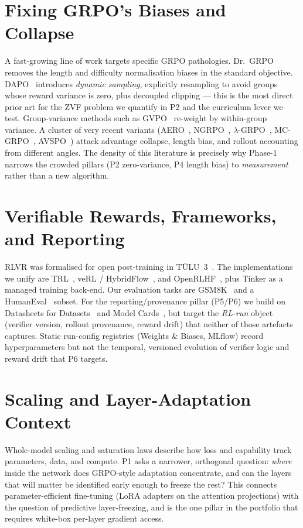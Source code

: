 \section{Fixing GRPO's Biases and Collapse}
A fast-growing line of work targets specific GRPO pathologies. Dr.\
GRPO~\cite{liu2025drgrpo} removes the length and difficulty normalisation biases in
the standard objective. DAPO~\cite{yu2025dapo} introduces \emph{dynamic sampling},
explicitly resampling to avoid groups whose reward variance is zero, plus decoupled
clipping --- this is the most direct prior art for the ZVF problem we quantify in
P2 and the curriculum lever we test. Group-variance methods such as
GVPO~\cite{gvpo2025} re-weight by within-group variance. A cluster of very recent
variants (AERO~\cite{aero2026}, NGRPO~\cite{ngrpo2025},
$\lambda$-GRPO~\cite{lambdagrpo2025}, MC-GRPO~\cite{mcgrpo2026},
AVSPO~\cite{avspo2026}) attack advantage collapse, length bias, and rollout
accounting from different angles. The density of this literature is precisely why
Phase-1 narrows the crowded pillars (P2 zero-variance, P4 length bias) to
\emph{measurement} rather than a new algorithm.

\section{Verifiable Rewards, Frameworks, and Reporting}
RLVR was formalised for open post-training in T\"ULU~3~\cite{lambert2024tulu3}. The
implementations we unify are TRL~\cite{vonwerra2020trl}, veRL /
HybridFlow~\cite{sheng2024hybridflow}, and OpenRLHF~\cite{hu2024openrlhf}, plus
Tinker as a managed training back-end. Our evaluation tasks are
GSM8K~\cite{cobbe2021gsm8k} and a HumanEval~\cite{chen2021humaneval} subset. For the
reporting/provenance pillar (P5/P6) we build on Datasheets for
Datasets~\cite{gebru2021datasheets} and Model Cards~\cite{mitchell2019modelcards},
but target the \emph{RL-run} object (verifier version, rollout provenance, reward
drift) that neither of those artefacts captures. Static run-config registries
(Weights \& Biases, MLflow) record hyperparameters but not the temporal, versioned
evolution of verifier logic and reward drift that P6 targets.

\section{Scaling and Layer-Adaptation Context}
Whole-model scaling and saturation laws describe how loss and capability track
parameters, data, and compute. P1 asks a narrower, orthogonal question: \emph{where}
inside the network does GRPO-style adaptation concentrate, and can the layers that
will matter be identified early enough to freeze the rest? This connects
parameter-efficient fine-tuning (LoRA adapters on the attention projections) with
the question of predictive layer-freezing, and is the one pillar in the portfolio
that requires white-box per-layer gradient access.

